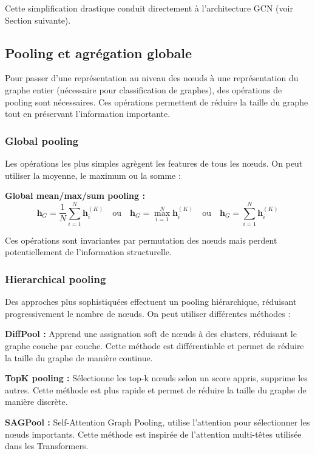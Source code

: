 Cette simplification drastique conduit directement à l'architecture GCN (voir Section suivante).

\subsection{Pooling et agrégation globale}

Pour passer d'une représentation au niveau des nœuds à une représentation du graphe entier (nécessaire pour classification de graphes), des opérations de pooling sont nécessaires. Ces opérations permettent de réduire la taille du graphe tout en préservant l'information importante.

\subsubsection{Global pooling}

Les opérations les plus simples agrègent les features de tous les nœuds. On peut utiliser la moyenne, le maximum ou la somme :

\textbf{Global mean/max/sum pooling :}
\[
\mathbf{h}_G = \frac{1}{N}\sum_{i=1}^N \mathbf{h}_i^{(K)} \quad \text{ou} \quad \mathbf{h}_G = \max_{i=1}^N \mathbf{h}_i^{(K)} \quad \text{ou} \quad \mathbf{h}_G = \sum_{i=1}^N \mathbf{h}_i^{(K)}
\]

Ces opérations sont invariantes par permutation des nœuds mais perdent potentiellement de l'information structurelle.

\subsubsection{Hierarchical pooling}

Des approches plus sophistiquées effectuent un pooling hiérarchique, réduisant progressivement le nombre de nœuds. On peut utiliser différentes méthodes :

\textbf{DiffPool :}
Apprend une assignation soft de nœuds à des clusters, réduisant le graphe couche par couche. Cette méthode est différentiable et permet de réduire la taille du graphe de manière continue.

\textbf{TopK pooling :}
Sélectionne les top-k nœuds selon un score appris, supprime les autres. Cette méthode est plus rapide et permet de réduire la taille du graphe de manière discrète.

\textbf{SAGPool :}
Self-Attention Graph Pooling, utilise l'attention pour sélectionner les nœuds importants. Cette méthode est inspirée de l'attention multi-têtes utilisée dans les Transformers.

